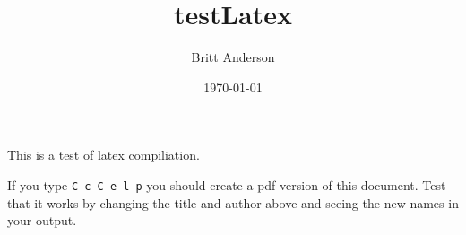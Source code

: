 \documentclass{article}
\author{Britt Anderson}
\date{\today}
\title{testLatex}
\begin{document}
\maketitle
\tableofcontents

This is a test of latex compiliation. 

If you type \texttt{C-c C-e l p} you should create a pdf version of this document. Test that it works by changing the title and author above and seeing the new names in your output. 
\end{document}
